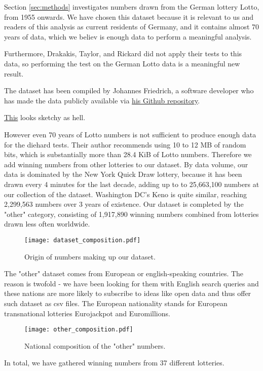 Section \ref{sec:methods} investigates numbers drawn from the German lottery Lotto, from 1955 onwards. 
We have chosen this dataset because it is relevant to us and readers of this analysis as current residents of Germany, 
and it contains almost 70 years of data, which we believ is enough data to perform a meaningful analysis.

Furthermore, Drakakis, Taylor, and Rickard did not apply their tests to this data, so 
performing the test on the German Lotto data is a meaningful new result.

The dataset has been compiled by Johannes Friedrich, 
a software developer who has made the data publicly available via 
\href{https://github.com/JohannesFriedrich/LottoNumberArchive}{his Github repository}.


 \href{https://notebook.community/JesseScott/Lotto649/lotto}{This} looks sketchy as hell.

However even 70 years of Lotto numbers is not sufficient to produce enough data for the diehard tests. Their author recommends
using 10 to 12 MB of random bits, which is substantially more than 28.4 KiB of Lotto numbers. Therefore we add winning numbers
from other lotteries to our dataset. By data volume, our data is dominated by the New York Quick Draw lottery, because it has
been drawn every 4 minutes for the last decade, adding up to to 25,663,100 numbers at our collection of the dataset.
Washington DC's Keno is quite similar, reaching 2,299,563 numbers over 3 years of existence. Our dataset is completed by
the "other" category, consisting of 1,917,890 winning numbers combined from lotteries drawn less often worldwide.

\begin{figure}
    \centering
    \texttt{[image: dataset\_composition.pdf]}
    \caption{Origin of numbers making up our dataset.}
    \label{fig:dataset}
\end{figure}

The "other" dataset comes from European or english-speaking countries. The reason is twofold - we have been looking
for them with English search queries and these nations are more likely to subscribe to ideas like open data and thus
offer such dataset as csv files. The European nationality stands for European transnational lotteries Eurojackpot and Euromillions.

\begin{figure}
    \centering
    \texttt{[image: other\_composition.pdf]}
    \caption{National composition of the "other" numbers.}
\end{figure}

In total, we have gathered winning numbers from 37 different lotteries.
